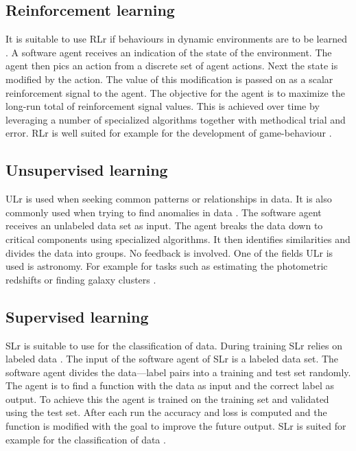 \subsection{Reinforcement learning} \label{reinforcementLearning}
It is suitable to use RLr if behaviours in dynamic environments are to be learned \cite{reinforcementLearningIntroduction}. A software agent receives an indication of the state of the environment. The agent then pics an action from a discrete set of agent actions. Next the state is modified by the action. The value of this modification is passed on as a scalar reinforcement signal to the agent. The objective for the agent is to maximize the long-run total of reinforcement signal values. This is achieved over time by leveraging a number of specialized algorithms together with methodical trial and error. RLr is well suited for example for the development of game-behaviour \cite{reinforcementLearningGames}.

\subsection{Unsupervised learning} \label{unsupervisedLearning}
 ULr is used when seeking common patterns or relationships in data. It is also commonly used when trying to find anomalies in data \cite{unsupervisedLearningIntroduction}. The software agent receives an unlabeled data set as input. The agent breaks the data down to critical components using specialized algorithms. It then identifies similarities and divides the data into groups. No feedback is involved. One of the fields ULr is used is astronomy. For example for tasks such as estimating the photometric  redshifts or finding galaxy clusters \cite{unsuperviseLEarningAstronomy}. 

\subsection{Supervised learning} \label{supervisedLearning}
SLr is suitable to use for the classification of data. During training SLr relies on labeled data \cite{machineLeraningApproaches}. The input of the software agent of SLr is a labeled data set. The software agent divides the data---label pairs into a training and test set randomly. The agent is to find a function with the data as input and the correct label as output. To achieve this the agent is trained on the training set and validated using the test set. After each run the accuracy and loss is computed and the function is modified with the goal to improve the future output. SLr is suited for example for the classification of data \cite{supervisedLearningClassification}. 

